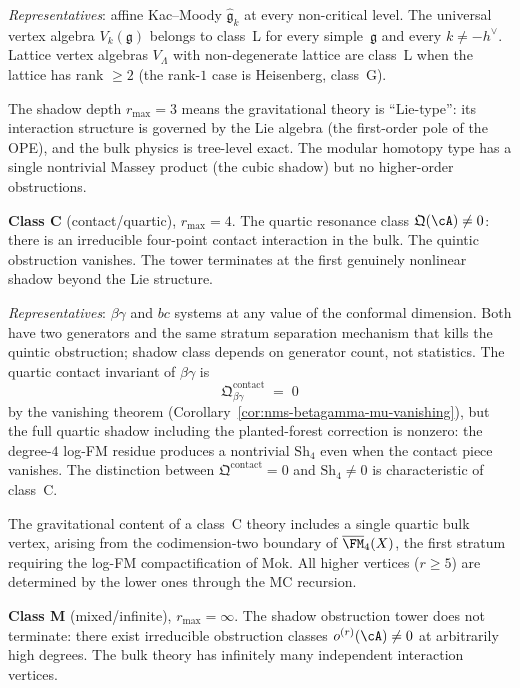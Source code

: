 \emph{Representatives}: affine Kac--Moody
$\widehat{\mathfrak g}_k$ at every non-critical level. The
universal vertex algebra $V_k(\mathfrak g)$ belongs to class~L
for every simple~$\mathfrak g$ and every
$k\neq-h^\vee$. Lattice vertex algebras $V_\Lambda$ with
non-degenerate lattice are class~L when the lattice has rank
$\ge 2$ (the rank-$1$ case is Heisenberg, class~G).

The shadow depth $r_{\max}=3$ means the gravitational
theory is ``Lie-type'': its interaction structure is governed
by the Lie algebra (the first-order pole of the OPE), and the
bulk physics is tree-level exact. The modular homotopy type
has a single nontrivial Massey product (the cubic shadow) but no
higher-order obstructions.

\medskip\noindent
\textbf{Class C} (contact/quartic), $r_{\max}=4$.\enspace
The quartic resonance class $\mathfrak Q(\cA)\neq 0$: there is
an irreducible four-point contact interaction in the bulk. The
quintic obstruction vanishes. The tower terminates at the first
genuinely nonlinear shadow beyond the Lie structure.

\emph{Representatives}: $\beta\gamma$ and $bc$ systems at any
value of the conformal dimension. Both have two generators and the
same stratum separation mechanism that kills the quintic obstruction;
shadow class depends on generator count, not statistics.
The quartic contact invariant of $\beta\gamma$
is
\[
\mathfrak Q^{\mathrm{contact}}_{\beta\gamma}
\;=\;0
\]
by the vanishing theorem
(Corollary~\ref{cor:nms-betagamma-mu-vanishing}), but the full
quartic shadow including the planted-forest correction is
nonzero: the degree-$4$ log-FM residue produces a nontrivial
$\mathrm{Sh}_4$ even when the contact piece vanishes. The
distinction between $\mathfrak Q^{\mathrm{contact}}=0$ and
$\mathrm{Sh}_4\neq 0$ is characteristic of class~C.

The gravitational content of a class~C theory includes a
single quartic bulk vertex, arising from the codimension-two
boundary of $\overline{\FM}_4(X)$, the first stratum requiring
the log-FM compactification of Mok. All
higher vertices ($r\ge 5$) are determined by the lower ones
through the MC recursion.

\medskip\noindent
\textbf{Class M} (mixed/infinite), $r_{\max}=\infty$.\enspace
The shadow obstruction tower does not terminate: there exist irreducible
obstruction classes $o^{(r)}(\cA)\neq 0$ at arbitrarily high
degrees. The bulk theory has infinitely many independent
interaction vertices.

